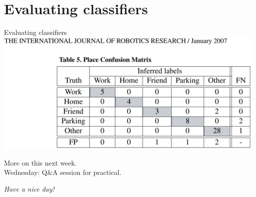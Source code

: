 \documentclass[xcolor=table,aspectratio=169]{beamer}
\begin{document}
\section{Evaluating classifiers}
\begin{frame}{Evaluating classifiers}
	\includegraphics[width=\textwidth]{pics/confusion-place.png}
\end{frame}

\begin{frame}
More on this next week.\\
Wednesday: Q\&A session for practical.
\vfill
	
  \begin{center}
  \emph{Have a nice day!}
  \end{center}

\end{frame}
\end{document}

